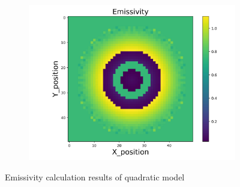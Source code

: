\begin{figure}[p]
\begin{minipage}{\textwidth}
\begin{subfigure}{0.325\textwidth}
            \centering
            \includegraphics[width=\textwidth]{figures/raw_data/33/quad/emi_cal.jpg}
        \end{subfigure}
    \end{minipage}
    \caption{Emissivity calculation results of quadratic model}  
\end{figure}


\newpage

